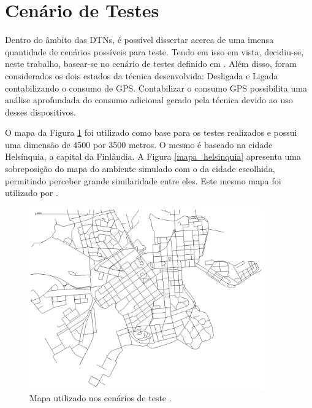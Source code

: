 \section{Cenário de Testes}
\label{sec:cenario}

Dentro do âmbito das DTNs, é possível dissertar acerca de uma imensa quantidade de cenários possíveis para teste. Tendo em isso em vista, decidiu-se, neste trabalho, basear-se no cenário de testes definido em \cite{denis_artigo}. Além disso, foram considerados os dois estados da técnica desenvolvida: Desligada e Ligada contabilizando o consumo de GPS. Contabilizar o consumo GPS possibilita uma análise aprofundada do consumo adicional gerado pela técnica devido ao uso desses dispositivos.

O mapa da Figura \ref{mapa_tecnica} foi utilizado como base para os testes realizados e possui uma dimensão de 4500 por 3500 metros. O mesmo é baseado na cidade Helsínquia, a capital da Finlândia. A Figura \ref{mapa_helsinquia} apresenta uma sobreposição do mapa do ambiente simulado com o da cidade escolhida, permitindo perceber grande similaridade entre eles. Este mesmo mapa foi utilizado por \cite{denis_artigo}.

\begin{figure}[htp!]
\centering
\includegraphics[width=0.9\textwidth]{figuras/cap_5/mapa.png}
\caption{Mapa utilizado nos cenários de teste \cite{keranen2009one}.}
\label{mapa_tecnica}
\end{figure}

